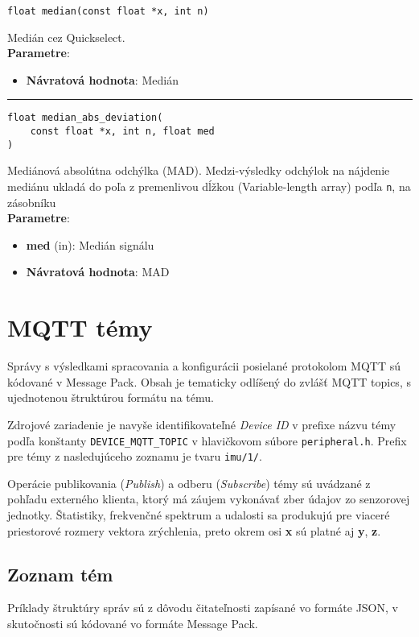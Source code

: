 \begin{lstlisting}[style=docs]
float median(const float *x, int n)
\end{lstlisting}
Medián cez Quickselect. \\ 
\textbf{Parametre}:
\begin{itemize}[noitemsep, topsep=0pt]
	\item \textbf{Návratová hodnota}: Medián
\end{itemize}
\bigbreak
\hrule

\begin{lstlisting}[style=docs]
float median_abs_deviation(
	const float *x, int n, float med
)
\end{lstlisting}
Mediánová absolútna odchýlka (MAD).  Medzi-výsledky odchýlok na nájdenie mediánu ukladá
do poľa z premenlivou dĺžkou (Variable-length array) podľa \verb|n|, na zásobníku \\
\textbf{Parametre}:
\begin{itemize}[noitemsep, topsep=0pt]
	\item \textbf{med} (in):  Medián signálu
	\item \textbf{Návratová hodnota}: MAD
\end{itemize}
\bigbreak

\section{MQTT témy}
Správy s výsledkami spracovania a konfigurácii posielané protokolom MQTT sú kódované v Message Pack.
Obsah je tematicky odlíšený do zvlášť MQTT topics, s ujednotenou štruktúrou formátu na tému.

Zdrojové zariadenie je navyše identifikovateľné \emph{Device ID} v prefixe názvu témy podľa konštanty
\verb|DEVICE_MQTT_TOPIC| v hlavičkovom súbore \verb|peripheral.h|. Prefix pre témy z nasledujúceho zoznamu je 
tvaru \verb|imu/1/|. 

Operácie publikovania (\emph{Publish}) a odberu (\emph{Subscribe}) témy sú uvádzané z pohľadu
externého klienta, ktorý má záujem vykonávať zber údajov zo senzorovej jednotky. Štatistiky, frekvenčné spektrum
a udalosti sa produkujú pre viaceré priestorové rozmery vektora zrýchlenia, preto okrem osi \textbf{x} sú platné 
aj \textbf{y}, \textbf{z}.
\bigbreak

\subsection*{Zoznam tém}
Príklady štruktúry správ sú z dôvodu čitateľnosti zapísané vo formáte JSON, v skutočnosti sú
kódované vo formáte Message Pack.

